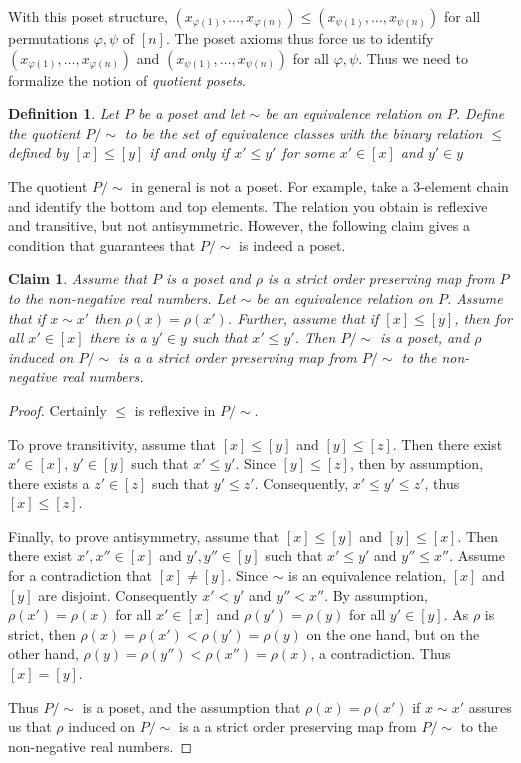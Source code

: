 \documentclass[acmsmall,review,anonymous]{acmart}\settopmatter{printfolios=true,printccs=false,printacmref=false}
\newtheorem{definition}{Definition}
\newtheorem{claim}{Claim}
\begin{document}
With this poset structure, $(x_{\varphi(1)}, \ldots, x_{\varphi(n)}) \leq
(x_{\psi(1)}, \ldots, x_{\psi(n)})$ for all permutations
$\varphi, \psi$ of $[n]$. The poset axioms thus force us to identify
$(x_{\varphi(1)}, \ldots, x_{\varphi(n)})$ and $(x_{\psi(1)}, \ldots,
x_{\psi(n)})$ for all $\varphi, \psi$. Thus we need to formalize the notion of
{\em quotient posets}.

\begin{definition}
Let $P$ be a poset and let $\sim$ be an equivalence relation on $P$. Define the
quotient $P/{\sim}$ to be the set of equivalence classes with the binary
relation $\leq$ defined by $[x] \leq [y]$ if and only if $x' \leq y'$ for some
$x' \in [x]$ and $y' \in y$
\end{definition}
The quotient $P/{\sim}$ in general is not a poset. For example, take a
3-element chain and identify the bottom and top elements. The relation you
obtain is reflexive and transitive, but not antisymmetric. However, the
following claim gives a condition that guarantees that $P/{\sim}$ is indeed a
poset.

\begin{claim}\label{quotientposet}
Assume that $P$ is a poset and $\rho$ is a strict order preserving map from $P$
to the non-negative real numbers. Let $\sim$ be an equivalence relation on $P$.
Assume that if $x \sim x'$ then $\rho(x) = \rho(x')$. Further, assume that if
$[x] \leq [y]$, then for all $x' \in [x]$ there is a $y' \in y$ such that $x'
\leq y'$. Then $P/{\sim}$ is a poset, and $\rho$ induced on $P/{\sim}$ is a
a strict order preserving map from $P/{\sim}$ to the non-negative real numbers.
\end{claim}
\begin{proof}
Certainly $\leq$ is reflexive in $P/{\sim}$.

To prove transitivity, assume that $[x] \leq [y]$ and $[y] \leq [z]$. Then
there exist $x' \in [x]$, $y' \in [y]$ such that $x' \leq y'$. Since $[y] \leq
[z]$, then by assumption, there exists a $z' \in [z]$ such that $y' \leq z'$.
Consequently, $x' \leq y' \leq z'$, thus $[x] \leq [z]$.

Finally, to prove antisymmetry, assume that $[x] \leq [y]$ and $[y] \leq [x]$.
Then there exist $x', x'' \in [x]$ and $y', y'' \in [y]$ such that $x' \leq y'$
and $y'' \leq x''$. Assume for a contradiction that $[x] \neq [y]$. Since $\sim$
is an equivalence relation, $[x]$ and $[y]$ are disjoint. Consequently $x' <
y'$ and $y'' < x''$. By assumption, $\rho(x') = \rho(x)$ for all $x' \in [x]$
and $\rho(y') = \rho(y)$ for all $y' \in [y]$. As $\rho$ is strict, then
$\rho(x) = \rho(x') < \rho(y') = \rho(y)$ on the one hand, but on the other
hand, $\rho(y) = \rho(y'') < \rho(x'') = \rho(x)$, a contradiction. Thus $[x] =
[y]$.

Thus $P/{\sim}$ is a poset, and the assumption that $\rho(x) = \rho(x')$
if $x \sim x'$ assures us that $\rho$ induced on $P/{\sim}$ is a
a strict order preserving map from $P/{\sim}$ to the non-negative real numbers.
\end{proof}
\end{document}

